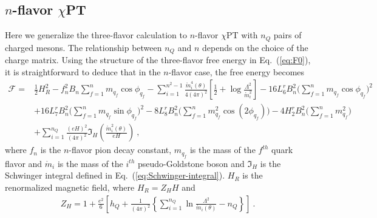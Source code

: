 \documentclass[12pt]{elsarticle}
\begin{document}
\subsection{$n$-flavor $\chi$PT} 
\label{sec:nf}
\noindent
Here we generalize the three-flavor calculation to $n$-flavor $\chi$PT with $n_{Q}$ pairs of charged mesons. The relationship between $n_{Q}$ and $n$ depends on the choice of the charge matrix. Using the structure of the three-flavor free energy in Eq.~(\ref{eq:F0}), it is straightforward to deduce that in the $n$-flavor case, the free energy becomes
\begin{equation}
\begin{split}
\mathcal{F}=&\frac{1}{2}H_{R}^{2}-f_{n}^{2}B_{n}\sum_{f=1}^{n}m_{q_{f}}\cos\phi_{q_{f}}-\sum_{i=1}^{n^{2}-1}\frac{\mathring{m}_{i}^{4}(\theta)}{4(4\pi)^{2}}\left[\frac{1}{2}+\log\frac{\Lambda^{2}}{\mathring{m}_{i}^{2}} \right ]-16L^{r}_{6}B^{2}_{n}\Big(\sum_{f=1}^{n}m_{q_{f}}\cos\phi_{q_{f}}\Big)^{2}\\
&+16L^{r}_{7}B_{n}^{2}\Big(\sum_{f=1}^{n}m_{q_{f}}\sin\phi_{q_{f}}\Big)^{2}-8L^{r}_{8}B_{n}^{2}\Big(\sum_{f=1}^{n}m_{q_{f}}^{2}\cos(2\phi_{q_{f}})\Big)-4H^{r}_{2}B_{n}^{2}\Big(\sum_{f=1}^{n}m_{q_{f}}^{2}\Big)\\
&+\sum_{i=1}^{n_{Q}}\frac{(eH)^{2}}{(4\pi)^{2}}\mathfrak{I}_{H}(\tfrac{\mathring{m}_{i}^{2}(\theta)}{eH})\ ,
\end{split}
\end{equation}
where $f_{n}$ is the $n$-flavor pion decay constant, $m_{q_{f}}$ is the mass of the $f^{th}$ quark flavor and $\mathring{m}_{i}$ is the mass of the $i^{th}$ pseudo-Goldstone boson and $\mathfrak{I}_{H}$ is the Schwinger integral defined in Eq.~(\ref{eq:Schwinger-integral}). $H_{R}$ is the renormalized magnetic field, where $H_{R}=Z_{H}H$ and
\begin{equation}
\begin{split}
Z_{H}=1+\frac{e^{2}}{6}\left [h_{Q}+\frac{1}{(4\pi)^{2}}\left\{\sum_{i=1}^{n_{Q}}\ln\frac{\Lambda^{2}}{\mathring{m}_{i}(\theta)}-n_{Q}\right\}\right]\ .
\end{split}
\end{equation}
\end{document}
